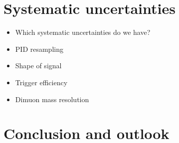 %
%
%

\chapter{Systematic uncertainties} %

\begin{itemize}
  \item Which systematic uncertainties do we have?
  \item PID resampling
  \item Shape of signal
  \item Trigger efficiency
  \item Dimuon mass resolution
\end{itemize}

\chapter{Conclusion and outlook} %

\nocite{pdg}

